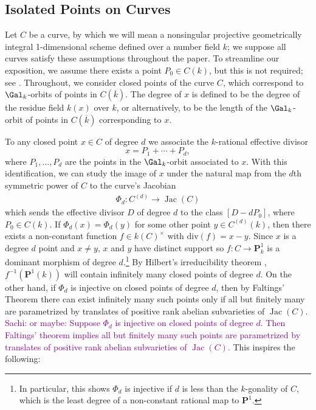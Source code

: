 \documentclass[11pt,reqno]{amsart}
\theoremstyle{plain}
\theoremstyle{definition}
\newcommand{\Jac}{\operatorname{Jac}}
\newcommand{\sachi}[1]{\textcolor{purple}{Sachi: #1}}
\begin{document}
\subsection{Isolated Points on Curves}
Let $C$ be a curve, by which we will mean a nonsingular projective geometrically integral 1-dimensional scheme defined over a number field $k$; we suppose all curves satisfy these assumptions throughout the paper. To streamline our exposition, we assume there exists a point $P_0 \in C(k)$, but this is not required; see \cite[$\S4$]{BELOV}. Throughout, we consider closed points of the curve $C$, which correspond to $\Gal_k$-orbits of points in $C(\overline{k})$. The degree of $x$ is defined to be the degree of the residue field $k(x)$ over $k$, or alternatively, to be the length of the $\Gal_k$-orbit of points in $C(\overline{k})$ corresponding to $x$.

To any closed point $x \in C$ of degree $d$ we associate the $k$-rational effective divisor
\[
 x=P_1+ \cdots +P_{d},
\]
where $P_1, \dots, P_{d}$ are the points in the $\Gal_{k}$-orbit associated to $x$. With this identification, we can study the image of $x$ under the natural map from the $d$th symmetric power of $C$ to the curve's Jacobian
\begin{align}
\label{eqn:phid}
\Phi_d: C^{(d)} \rightarrow \Jac(C)
\end{align}
which sends the effective divisor $D$ of degree $d$ to the class $[D - dP_0]$, where $P_0 \in C(k)$. If $\Phi_d(x)=\Phi_d(y)$ for some other point $y \in C^{(d)}(k)$, then there exists a non-constant function $f \in k(C)^{\times}$ with $\text{div}(f)=x-y$. Since $x$ is a degree $d$ point and $x\not=y$, $x$ and $y$ have distinct support so $f: C \rightarrow \mathbf{P}^1_{k}$ is a dominant morphism of degree $d$.\footnote{In particular, this shows $\Phi_d$ is injective if $d$ is less than the $k$-gonality of $C$, which is the least degree of a non-constant rational map to $\mathbf{P}^1$.} By Hilbert's irreducibility theorem \cite[Chapter 9]{serre97}, $f^{-1}(\mathbf{P}^{1}(k))$ will contain infinitely many closed points of degree $d$. On the other hand, if $\Phi_d$ is injective on closed points of degree $d$, then by Faltings' Theorem \cite{faltings} there can exist infinitely many such points only if all but finitely many are parametrized by translates of positive rank abelian subvarieties of $\Jac(C)$. \sachi{or maybe: Suppose $\Phi_d$ is injective on closed points of degree $d$. Then Faltings' theorem \cite{faltings} implies all but finitely many such points are parametrized by translates of positive rank abelian subvarieties of $\Jac(C)$.}
This inspires the following:
\end{document}
